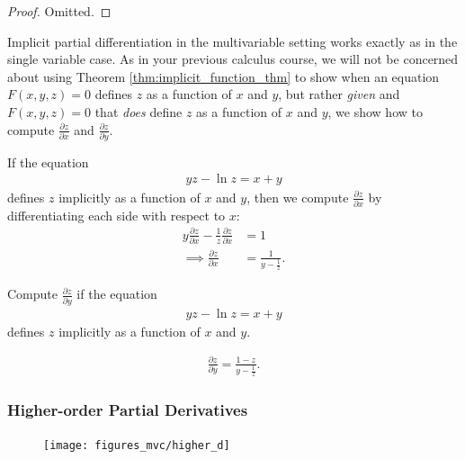 \documentclass[12pt,letterpaper,reqno]{article}
\numberwithin{equation}{section}
\begin{document}
{\begin{proof}
	Omitted.
\end{proof}

Implicit partial differentiation in the multivariable setting works exactly as in the single variable case. As in your previous calculus course, we will not be concerned about using Theorem \ref{thm:implicit_function_thm} to show when an equation $F(x,y,z)=0$ defines $z$ as a function of $x$ and $y$, but rather \emph{given} and $F(x,y,z)=0$ that \emph{does} define $z$ as a function of $x$ and $y$, we show how to compute $\frac{\partial z}{\partial x}$ and $\frac{\partial z}{\partial y}$.

\begin{example}
If the equation
\begin{align*}
	yz-\ln z=x+y
\end{align*}	
defines $z$ implicitly as a function of $x$ and $y$, then we compute $\frac{\partial z}{\partial x}$ by differentiating each side with respect to $x$:
\begin{align*}
	y\frac{\partial z}{\partial x}-\frac{1}{z}\frac{\partial z}{\partial x}&=1 \\
	\implies \frac{\partial z}{\partial x}&=\frac{1}{y-\frac{1}{z}}.
\end{align*}
\end{example}

\begin{exercise}
	Compute $\frac{\partial z}{\partial y}$ if the equation
\begin{align*}
	yz-\ln z=x+y
\end{align*}	
defines $z$ implicitly as a function of $x$ and $y$.
\end{exercise}

{\color{red}
\begin{solution}
\begin{align*}
	\frac{\partial z}{\partial y}=\frac{1-z}{y-\frac{1}{z}}.
\end{align*}	
\end{solution}

}

\newpage 

\subsubsection{Higher-order Partial Derivatives}
\begin{figure}[h]
	\begin{center}
		\texttt{[image: figures\_mvc/higher\_d]}
	\end{center}
\end{figure}

}
\end{document}
